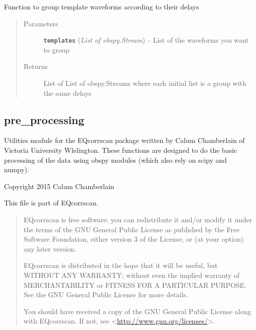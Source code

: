 \documentclass[a4paper,10pt,english]{sphinxmanual}
\begin{document}

\begin{fulllineitems}
\label{utils:clustering.group_delays}
Function to group template waveforms according to their delays
\begin{quote}\begin{description}
\item[{Parameters}] \leavevmode
\textbf{\texttt{templates}} (\emph{List of obspy.Stream}) -- List of the waveforms you want to group

\item[{Returns}] \leavevmode
List of List of obspy.Streams where each initial list is a group
with the same delays

\end{description}\end{quote}

\end{fulllineitems}



\subsection{pre\_processing}
\label{utils:pre-processing}\label{utils:module-pre_processing}
Utilities module for the EQcorrscan package written by Calum Chamberlain of
Victoria University Wlelington.  These functions are designed to do the basic
processing of the data using obspy modules (which also rely on scipy and numpy).

Copyright 2015 Calum Chamberlain

This file is part of EQcorrscan.
\begin{quote}

EQcorrscan is free software: you can redistribute it and/or modify
it under the terms of the GNU General Public License as published by
the Free Software Foundation, either version 3 of the License, or
(at your option) any later version.

EQcorrscan is distributed in the hope that it will be useful,
but WITHOUT ANY WARRANTY; without even the implied warranty of
MERCHANTABILITY or FITNESS FOR A PARTICULAR PURPOSE.  See the
GNU General Public License for more details.

You should have received a copy of the GNU General Public License
along with EQcorrscan.  If not, see \textless{}\href{http://www.gnu.org/licenses/}{http://www.gnu.org/licenses/}\textgreater{}.
\end{quote}
\end{document}
